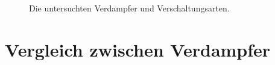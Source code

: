 \begin{figure}[h!tb]
\caption{Die untersuchten Verdampfer und Verschaltungsarten.}
\label{fig:Verschaltungsarten}
\end{figure}




\section{Vergleich zwischen Verdampfer}
\label{sec:Änderung der Verdampferschaltung}

